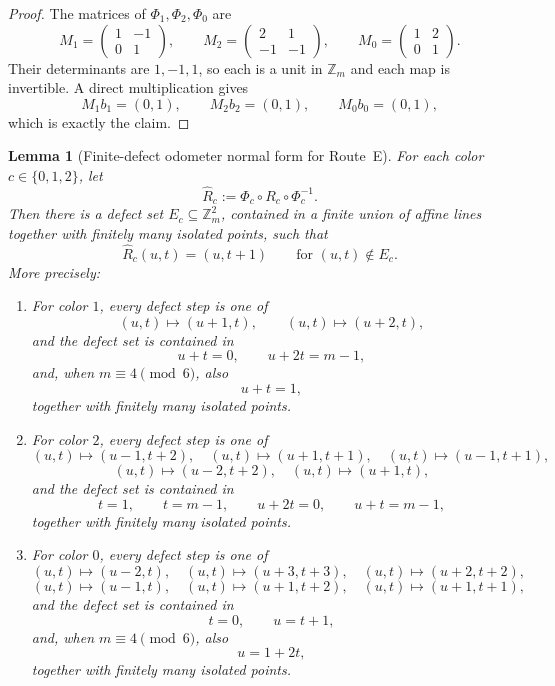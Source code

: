 \documentclass[11pt]{article}
\newtheorem{lemma}{Lemma}
\newcommand{\Zm}{\mathbb Z_m}
\begin{document}
\begin{proof}
The matrices of $\Phi_1,\Phi_2,\Phi_0$ are
\[
M_1=\begin{pmatrix}1&-1\\0&1\end{pmatrix},\qquad
M_2=\begin{pmatrix}2&1\\-1&-1\end{pmatrix},\qquad
M_0=\begin{pmatrix}1&2\\0&1\end{pmatrix}.
\]
Their determinants are $1,-1,1$, so each is a unit in $\Zm$ and each map is invertible.
A direct multiplication gives
\[
M_1b_1=(0,1),\qquad M_2b_2=(0,1),\qquad M_0b_0=(0,1),
\]
which is exactly the claim.
\end{proof}

\begin{lemma}[Finite-defect odometer normal form for Route~E]\label{lem:routeE-finite-defect}
For each color $c\in\{0,1,2\}$, let
\[
\widehat R_c:=\Phi_c\circ R_c\circ \Phi_c^{-1}.
\]
Then there is a defect set $E_c\subseteq \Zm^2$, contained in a finite union of affine lines together with finitely many isolated points, such that
\[
\widehat R_c(u,t)=(u,t+1)\qquad\text{for }(u,t)\notin E_c.
\]
More precisely:
\begin{enumerate}[label=\textup{(\roman*)},leftmargin=2.5em]
\item For color $1$, every defect step is one of
\[
(u,t)\mapsto (u+1,t),\qquad (u,t)\mapsto (u+2,t),
\]
and the defect set is contained in
\[
u+t=0,\qquad u+2t=m-1,
\]
and, when $m\equiv 4\pmod 6$, also
\[
u+t=1,
\]
together with finitely many isolated points.

\item For color $2$, every defect step is one of
\[
(u,t)\mapsto (u-1,t+2),\quad (u,t)\mapsto (u+1,t+1),\quad (u,t)\mapsto (u-1,t+1),
\]
\[
(u,t)\mapsto (u-2,t+2),\quad (u,t)\mapsto (u+1,t),
\]
and the defect set is contained in
\[
t=1,\qquad t=m-1,\qquad u+2t=0,\qquad u+t=m-1,
\]
together with finitely many isolated points.

\item For color $0$, every defect step is one of
\[
(u,t)\mapsto (u-2,t),\quad (u,t)\mapsto (u+3,t+3),\quad (u,t)\mapsto (u+2,t+2),
\]
\[
(u,t)\mapsto (u-1,t),\quad (u,t)\mapsto (u+1,t+2),\quad (u,t)\mapsto (u+1,t+1),
\]
and the defect set is contained in
\[
t=0,\qquad u=t+1,
\]
and, when $m\equiv 4\pmod 6$, also
\[
u=1+2t,
\]
together with finitely many isolated points.
\end{enumerate}
\end{lemma}
\end{document}

